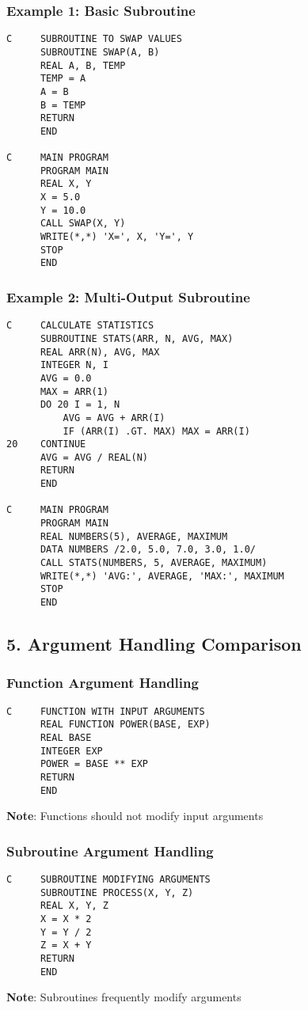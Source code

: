 \documentclass{book}
\begin{document}
\subsubsection*{Example 1: Basic Subroutine}
\begin{verbatim}
C     SUBROUTINE TO SWAP VALUES
      SUBROUTINE SWAP(A, B)
      REAL A, B, TEMP
      TEMP = A
      A = B
      B = TEMP
      RETURN
      END

C     MAIN PROGRAM
      PROGRAM MAIN
      REAL X, Y
      X = 5.0
      Y = 10.0
      CALL SWAP(X, Y)
      WRITE(*,*) 'X=', X, 'Y=', Y
      STOP
      END
\end{verbatim}

\subsubsection*{Example 2: Multi-Output Subroutine}
\begin{verbatim}
C     CALCULATE STATISTICS
      SUBROUTINE STATS(ARR, N, AVG, MAX)
      REAL ARR(N), AVG, MAX
      INTEGER N, I
      AVG = 0.0
      MAX = ARR(1)
      DO 20 I = 1, N
          AVG = AVG + ARR(I)
          IF (ARR(I) .GT. MAX) MAX = ARR(I)
20    CONTINUE
      AVG = AVG / REAL(N)
      RETURN
      END

C     MAIN PROGRAM
      PROGRAM MAIN
      REAL NUMBERS(5), AVERAGE, MAXIMUM
      DATA NUMBERS /2.0, 5.0, 7.0, 3.0, 1.0/
      CALL STATS(NUMBERS, 5, AVERAGE, MAXIMUM)
      WRITE(*,*) 'AVG:', AVERAGE, 'MAX:', MAXIMUM
      STOP
      END
\end{verbatim}

\subsection*{5. Argument Handling Comparison}
\subsubsection*{Function Argument Handling}
\begin{verbatim}
C     FUNCTION WITH INPUT ARGUMENTS
      REAL FUNCTION POWER(BASE, EXP)
      REAL BASE
      INTEGER EXP
      POWER = BASE ** EXP
      RETURN
      END
\end{verbatim}
\textbf{Note}: Functions should not modify input arguments

\subsubsection*{Subroutine Argument Handling}
\begin{verbatim}
C     SUBROUTINE MODIFYING ARGUMENTS
      SUBROUTINE PROCESS(X, Y, Z)
      REAL X, Y, Z
      X = X * 2
      Y = Y / 2
      Z = X + Y
      RETURN
      END
\end{verbatim}
\textbf{Note}: Subroutines frequently modify arguments
\end{document}

